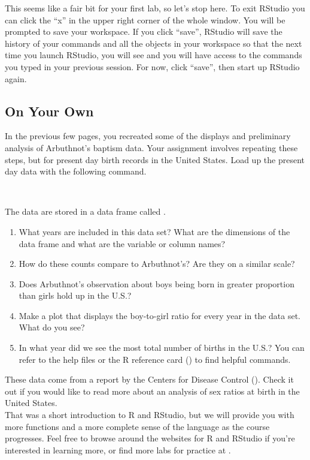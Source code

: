 \documentclass[11pt]{article}
\begin{document}
This seems like a fair bit for your first lab, so let's stop here. To exit RStudio you can click the ``x'' in the upper right corner of the whole window.  You will be prompted to save your workspace. If you click ``save'', RStudio will save the history of your commands and all the objects in your workspace so that the next time you launch RStudio, you will see \texttt{} and you will have access to the commands you typed in your previous session. For now, click ``save'', then start up RStudio again.

\pagebreak

\subsection*{On Your Own}

In the previous few pages, you recreated some of the displays and preliminary analysis of Arbuthnot's baptism data. Your assignment involves repeating these steps, but for present day birth records in the United States.  Load up the present day data with the following command.

\ttfamily
\hlstd{}\hspace*{\fill}\\
\hlstd{}\hlkeyword{(}\hlkeyword{)}\mbox{}
\normalfont

The data are stored in a data frame called \texttt{}.

\begin{enumerate}
\item What years are included in this data set? What are the dimensions of the data frame and what are the variable or column names?
\item How do these counts compare to Arbuthnot's? Are they on a similar scale?
\item Does Arbuthnot's observation about boys being born in greater proportion than girls hold up in the U.S.?
\item Make a plot that displays the boy-to-girl ratio for every year in the data set. What do you see?
\item In what year did we see the most total number of births in the U.S.? You can refer to the help files or the R reference card () to find helpful commands. \\
\end{enumerate}

These data come from a report by the Centers for Disease Control (). Check it out if you would like to read more about an analysis of sex ratios at birth in the United States. \\

That was a short introduction to R and RStudio, but we will provide you with more functions and a more complete sense of the language as the course progresses. Feel free to browse around the websites for R  and RStudio  if you're interested in learning more, or find more labs for practice at .
\end{document}
